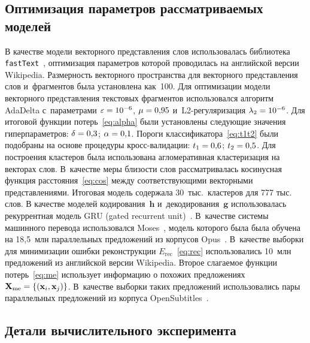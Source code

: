 \begin{multicols}{2}
\vspace*{-6pt}

\subsection{Оптимизация параметров рассматриваемых моделей}

В качестве модели векторного представления слов использовалась библиотека 
\texttt{fastText}~\cite{ft}, оптимизация параметров которой проводилась на 
английской версии Wikipedia. Размерность векторного пространства для векторного 
представления слов и~фрагментов была установлена как~100. Для оптимизации модели 
векторного представления текстовых фрагментов использовался алгоритм AdaDelta 
с~параметрами $\varepsilon\hm=10^{-6}$, $\mu\hm=0{,}95$ и~L2-ре\-гу\-ля\-ри\-за\-ция 
$\lambda_2\hm=10^{-6}$. Для итоговой  функции потерь~\eqref{eq:alpha} были установлены следующие 
значения гиперпараметров: $\delta\hm=0{,}3$; $\alpha\hm=0{,}1$. Пороги 
классификатора~\eqref{eq:t1t2} были подобраны на основе процедуры 
кросс-ва\-ли\-да\-ции: $t_1\hm=0{,}6$; $t_2\hm=0{,}5$. Для построения кластеров была использована 
агломеративная кластеризация на векторах слов. В~качестве меры близости слов 
рассматривалась косинусная  функция расстояния~\eqref{eq:cos} между 
соответствующими векторными представлениями. Итоговая модель содержала 30~тыс.\ 
кластеров для 777 тыс. слов. В качестве моделей кодирования~$\mathbf{h}$ 
и~декодирования~${\mathbf{g}}$ использовалась рекуррентная модель GRU
(gated recurrent unit)~\cite{gru}.
В~качестве системы машинного перевода использовался Moses~\cite{moses}, модель 
которого была была обучена на 18,5~млн параллельных предложений из корпусов 
Opus~\cite{opus}.
В~качестве выборки для минимизации ошибки реконструкции $E_{\mathrm{rec}}$~\eqref{eq:rec} 
использовались 10~млн предложений из английской версии Wikipedia.
Второе слагаемое функции потерь~\eqref{eq:me} использует информацию о похожих 
предложениях $\mathbf{X}_{\mathrm{me}}\hm = \{(\mathbf{x}_i, \mathbf{x}_j)\}$. 
В~качестве выборки таких предложений использовались пары параллельных предложений 
из корпуса OpenSubtitles~\cite{opus}. 

\vspace*{-6pt}

\subsection{Детали вычислительного эксперимента}


\end{multicols}
